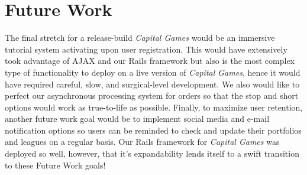 \section{Future Work}

The final stretch for a release-build \textit{Capital Games} would be an immersive tutorial 
system activating upon user registration. This would have extensively took advantage of AJAX 
and our Rails framework but also is the most complex type of functionality to deploy on a live 
version of \textit{Capital Games}, hence it would have required careful, slow, and surgical-level 
development. We also would like to perfect our asynchronous processing system for orders so that 
the stop and short options would work as true-to-life as possible. Finally, to maximize user 
retention, another future work goal would be to implement social media and e-mail notification 
options so users can be reminded to check and update their portfolios and leagues on a regular 
basis. Our Rails framework for \textit{Capital Games} was deployed so well, however, that it's 
expandability lends itself to a swift transition to these Future Work goals! 